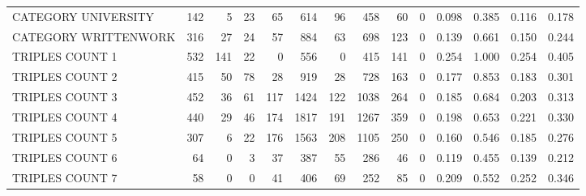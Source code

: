 \begin{tabular}{lrrrrrrrrrllll}
 CATEGORY UNIVERSITY      &             142 &             5 &              23 &              65 &             614 &   96 &  458 &   60 &    0 & 0.098 & 0.385 & 0.116 & 0.178 \\
 CATEGORY WRITTENWORK     &             316 &            27 &              24 &              57 &             884 &   63 &  698 &  123 &    0 & 0.139 & 0.661 & 0.150 & 0.244 \\
 TRIPLES COUNT 1          &             532 &           141 &              22 &               0 &             556 &    0 &  415 &  141 &    0 & 0.254 & 1.000 & 0.254 & 0.405 \\
 TRIPLES COUNT 2          &             415 &            50 &              78 &              28 &             919 &   28 &  728 &  163 &    0 & 0.177 & 0.853 & 0.183 & 0.301 \\
 TRIPLES COUNT 3          &             452 &            36 &              61 &             117 &            1424 &  122 & 1038 &  264 &    0 & 0.185 & 0.684 & 0.203 & 0.313 \\
 TRIPLES COUNT 4          &             440 &            29 &              46 &             174 &            1817 &  191 & 1267 &  359 &    0 & 0.198 & 0.653 & 0.221 & 0.330 \\
 TRIPLES COUNT 5          &             307 &             6 &              22 &             176 &            1563 &  208 & 1105 &  250 &    0 & 0.160 & 0.546 & 0.185 & 0.276 \\
 TRIPLES COUNT 6          &              64 &             0 &               3 &              37 &             387 &   55 &  286 &   46 &    0 & 0.119 & 0.455 & 0.139 & 0.212 \\
 TRIPLES COUNT 7          &              58 &             0 &               0 &              41 &             406 &   69 &  252 &   85 &    0 & 0.209 & 0.552 & 0.252 & 0.346 \\
\hline
\end{tabular}